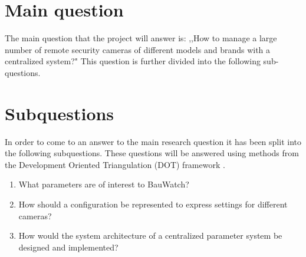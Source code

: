 
\section{Main question}
The main question that the project will answer is: ,,How to manage a large number of remote security cameras of different models and brands with a centralized system?"
This question is further divided into the following sub-questions.

\section{Subquestions}
In order to come to an answer to the main research question it has been split into the following subquestions.
These questions will be answered using methods from the Development Oriented Triangulation (DOT) framework \cite{dot_framework}.
\begin{enumerate}
	\item What parameters are of interest to BauWatch?
	\item How should a configuration be represented to express settings for different cameras?
	\item How would the system architecture of a centralized parameter system be designed and implemented?
\end{enumerate}

